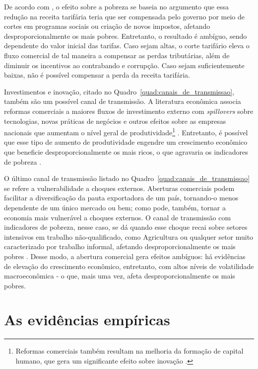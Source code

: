 De acordo com \textcite{bannisterthugge01}, o efeito sobre a pobreza se baseia no argumento que essa redução na receita tarifária teria que ser compensada pelo governo por meio de cortes em programas sociais ou criação de novos impostos, afetando desproporcionalmente os mais pobres. Entretanto, o resultado é ambíguo, sendo dependente do valor inicial das tarifas. Caso sejam altas, o corte tarifário eleva o fluxo comercial de tal maneira a compensar as perdas tributárias, além de diminuir os incentivos ao contrabando e corrupção. Caso sejam suficientemente baixas, não é possível compensar a perda da receita tarifária.

Investimentos e inovação, citado no Quadro~\ref{quad:canais_de_transmissao}, também são um possível canal de transmissão. A literatura econômica associa reformas comerciais a maiores fluxos de investimento externo com \textit{spillovers} sobre tecnologias, novas práticas de negócios e outros efeitos sobre as empresas nacionais que aumentam o nível geral de produtividade\footnote{Reformas comerciais também resultam na melhoria da formação de capital humano, que gera um significante efeito sobre inovação \cite{bannisterthugge01}.} \cite{bannisterthugge01}. Entretanto, é possível que esse tipo de aumento de produtividade engendre um crescimento econômico que beneficie desproporcionalmente os mais ricos, o que agravaria os indicadores de pobreza \cite{lundberg03}.

O último canal de transmissão listado no Quadro~\ref{quad:canais_de_transmissao} se refere a vulnerabilidade a choques externos. Aberturas comerciais podem facilitar a diversificação da pauta exportadora de um país, tornando-o menos dependente de um único mercado ou bem; como pode, também, tornar a economia mais vulnerável a choques externos. O canal de transmissão com indicadores de pobreza, nesse caso, se dá quando esse choque recai sobre setores intensivos em trabalho não-qualificado, como Agricultura ou qualquer setor muito caracterizado por trabalho informal, afetando desproporcionalmente os mais pobres \cite{bannisterthugge01}. Desse modo, a abertura comercial gera efeitos ambíguos: há evidências de elevação do crescimento econômico, entretanto, com altos níveis de volatilidade macroeconômica - o que, mais uma vez, afeta desproporcionalmente os mais pobres.



\section{As evidências empíricas} \label{sec:evidencias_empiricas}

